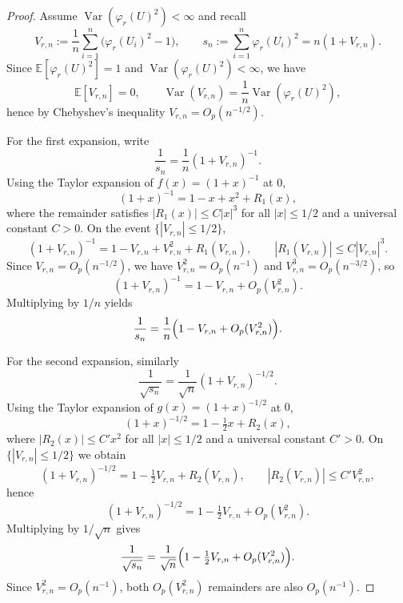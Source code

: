 \documentclass[11pt]{article}
\theoremstyle{plain}
\theoremstyle{remark}
\DeclareMathOperator{\Var}{Var}
\newcommand{\E}{\mathbb{E}}
\begin{document}
\begin{proof}
Assume $\Var(\varphi_r(U)^2)<\infty$ and recall
\[
V_{r,n}:=\frac{1}{n}\sum_{i=1}^n\bigl(\varphi_r(U_i)^2-1\bigr),
\qquad
s_n:=\sum_{i=1}^n \varphi_r(U_i)^2=n(1+V_{r,n}).
\]
Since $\E[\varphi_r(U)^2]=1$ and $\Var(\varphi_r(U)^2)<\infty$, we have
\[
\E[V_{r,n}]=0,
\qquad
\Var(V_{r,n})=\frac{1}{n}\Var(\varphi_r(U)^2),
\]
hence by Chebyshev's inequality $V_{r,n}=O_p(n^{-1/2})$.

For the first expansion, write
\[
\frac{1}{s_n}=\frac{1}{n}(1+V_{r,n})^{-1}.
\]
Using the Taylor expansion of $f(x)=(1+x)^{-1}$ at $0$,
\[
(1+x)^{-1}=1-x+x^2+R_1(x),
\]
where the remainder satisfies $|R_1(x)|\le C|x|^3$ for all $|x|\le 1/2$ and a
universal constant $C>0$. On the event $\{|V_{r,n}|\le 1/2\}$,
\[
(1+V_{r,n})^{-1}
=
1-V_{r,n}+V_{r,n}^2+R_1(V_{r,n}),
\qquad
|R_1(V_{r,n})|\le C|V_{r,n}|^3.
\]
Since $V_{r,n}=O_p(n^{-1/2})$, we have $V_{r,n}^2=O_p(n^{-1})$ and
$V_{r,n}^3=O_p(n^{-3/2})$, so
\[
(1+V_{r,n})^{-1}
=
1-V_{r,n}+O_p(V_{r,n}^2).
\]
Multiplying by $1/n$ yields
\[
\frac{1}{s_n}
=
\frac{1}{n}\Bigl(1-V_{r,n}+O_p(V_{r,n}^2)\Bigr).
\]

For the second expansion, similarly
\[
\frac{1}{\sqrt{s_n}}=\frac{1}{\sqrt n}(1+V_{r,n})^{-1/2}.
\]
Using the Taylor expansion of $g(x)=(1+x)^{-1/2}$ at $0$,
\[
(1+x)^{-1/2}=1-\tfrac12 x+R_2(x),
\]
where $|R_2(x)|\le C'x^2$ for all $|x|\le 1/2$ and a universal constant $C'>0$.
On $\{|V_{r,n}|\le 1/2\}$ we obtain
\[
(1+V_{r,n})^{-1/2}
=
1-\tfrac12 V_{r,n}+R_2(V_{r,n}),
\qquad
|R_2(V_{r,n})|\le C'V_{r,n}^2,
\]
hence
\[
(1+V_{r,n})^{-1/2}
=
1-\tfrac12 V_{r,n}+O_p(V_{r,n}^2).
\]
Multiplying by $1/\sqrt n$ gives
\[
\frac{1}{\sqrt{s_n}}
=
\frac{1}{\sqrt n}\Bigl(1-\tfrac12 V_{r,n}+O_p(V_{r,n}^2)\Bigr).
\]
Since $V_{r,n}^2=O_p(n^{-1})$, both $O_p(V_{r,n}^2)$ remainders are also
$O_p(n^{-1})$.
\end{proof}










\end{document}
